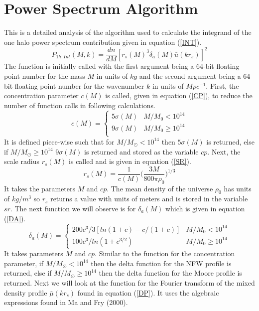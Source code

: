 \documentclass[12pt]{article}
\begin{document}
\section{Power Spectrum Algorithm}

This is a detailed analysis of the algorithm used to calculate the integrand of the one halo power spectrum contribution given in equation (\ref{INT}). 
\begin{equation} \label{INT}
    P_{1h,Int}(M, k) = \frac{dn}{dM} [r_{s}(M)^3 \delta_a(M) \bar{u} (kr_s)]^2
\end{equation}
The function is initially called with the first argument being a 64-bit floating point number for the mass $M$ in units of $kg$ and the second argument being a 64-bit floating point number for the wavenumber $k$ in units of $Mpc^{-1}$. First, the concentration parameter $c(M)$ is called, given in equation (\ref{CP}), to reduce the number of function calls in following calculations. 
\begin{equation} \label{CP}
	c(M) = 
	\begin{cases}
		5\sigma(M) & M/M_0 < 10^{14} \\
		9\sigma(M) & M/M_0 \geq 10^{14} \\
	\end{cases}
\end{equation}
It is defined piece-wise such that for $M/M_\odot < 10^{14}$ then $5\sigma(M)$ is returned, else if $M/M_\odot \geq 10^{14}$ $9\sigma(M)$ is returned and stored as the variable $cp$. Next, the scale radius $r_s(M)$ is called and is given in equation (\ref{SR}).
\begin{equation} \label{SR}
    r_s(M) = \frac{1}{c(M)} \Big(\frac{3M}{800 \pi \rho_0} \Big)^{1/3}
\end{equation}
It takes the parameters $M$ and $cp$. The mean density of the universe $\rho_0$ has units of $kg / m^3$ so $r_s$ returns a value with units of meters and is stored in the variable $sr$. The next function we will observe is for $\delta_a(M)$ which is given in equation (\ref{DA}).
\begin{equation} \label{DA}
	\delta_a(M) = 
	\begin{cases}
		200c^{3} / 3[ln(1+c) - c/(1+c)] & M/M_0 < 10^{14} \\
		100c^{3} / ln(1+c^{3/2})        & M/M_0 \geq 10^{14}
	\end{cases}
\end{equation}
It takes parameters $M$ and $cp$. Similar to the function for the concentration parameter, if  $M/M_\odot < 10^{14}$ then the delta function for the NFW profile is returned, else if  $M/M_\odot \geq 10^{14}$ then the delta function for the Moore profile is returned. Next we will look at the function for the Fourier transform of the mixed density profile $\bar{\mu}(kr_s)$ found in equation (\ref{DP}). It uses the algebraic expressions found in Ma and Fry (2000). 
\end{document}

